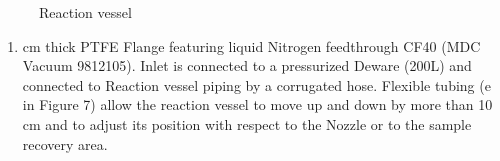 \documentclass[letterpaper,10pt,english]{jupyterBook}
\begin{document}
\begin{figure}[htbp]
\centering
\capstart

\noindent{}
\caption{Reaction vessel}\label{\detokenize{Chapter7/Chapter7:directive-fig2}}\end{figure}
\begin{enumerate}
%
\setcounter{enumi}{1}
\item {} 
 cm thick PTFE Flange featuring liquid Nitrogen feedthrough CF\sphinxhyphen{}40 (MDC Vacuum 9812105). Inlet is connected to a pressurized Deware (200L) and connected to Reaction vessel piping by a corrugated hose. Flexible tubing (e in Figure 7) allow the reaction vessel to move up and down by more than 10 cm and to adjust its position with respect to the Nozzle or to the sample recovery area.

\end{enumerate}
\end{document}
